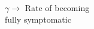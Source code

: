 \documentclass[preview]{standalone}
\begin{document}
\begin{center}
$\gamma \rightarrow$ Rate of becoming\\fully symptomatic
\end{center}
\end{document}
